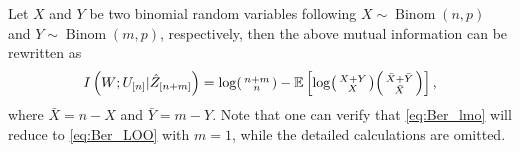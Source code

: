 \documentclass[onecolumn,romanappendices,10pt]{IEEEtran}
\newcommand{\EE}{{\mathbb{E}}}
\DeclareMathOperator{\Binomial}{Binom}
\begin{document}
	Let $X$ and $Y$ be two binomial random variables following $X \sim \Binomial(n, p)$ and $Y \sim \Binomial(m, p)$, respectively, then the above mutual information can be rewritten as
	\begin{equation}
		\begin{aligned}
			I\left( W; U_{[n]} | \hat{Z}_{[n+m]} \right) = \log \begin{psmallmatrix} n + m \\ n \end{psmallmatrix} - \EE \left[ \log \begin{psmallmatrix} X+Y \\ X \end{psmallmatrix} \begin{psmallmatrix} \bar{X} + \bar{Y} \\ \bar{X} \end{psmallmatrix} \right],
		\end{aligned}
		\label{eq:Ber_lmo}
	\end{equation}
	where $\bar{X} = n - X$ and $\bar{Y} = m - Y$. Note that one can verify that \eqref{eq:Ber_lmo} will reduce to \eqref{eq:Ber_LOO} with $m = 1$, while the detailed calculations are omitted.
	
\end{document}
